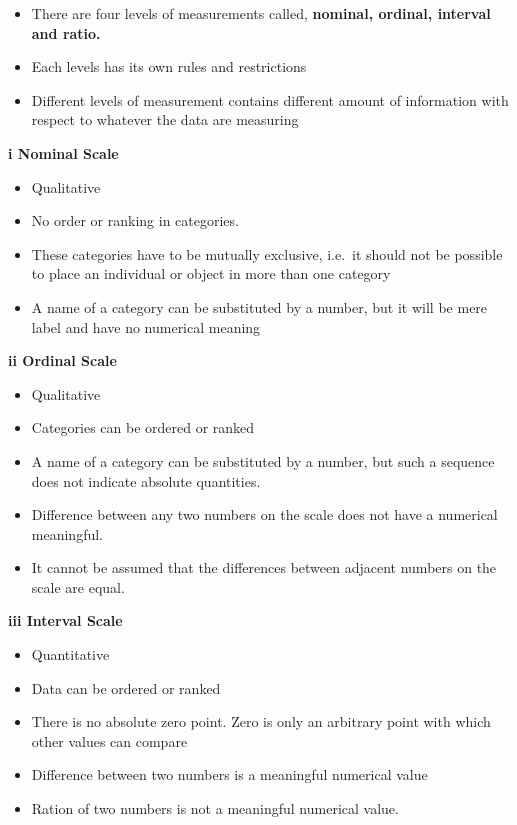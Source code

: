 \documentclass[]{book}
\providecommand{\tightlist}{%
  \setlength{\itemsep}{0pt}\setlength{\parskip}{0pt}}
\begin{document}
\begin{itemize}
\tightlist
\item
  There are four levels of measurements called, \textbf{nominal, ordinal, interval and ratio.}
\item
  Each levels has its own rules and restrictions
\item
  Different levels of measurement contains different amount of information with respect to whatever the data are measuring
\end{itemize}

\textbf{i Nominal Scale}

\begin{itemize}
\tightlist
\item
  Qualitative
\item
  No order or ranking in categories.
\item
  These categories have to be mutually exclusive, i.e.~it should not be possible to place an individual or object in more than one category
\item
  A name of a category can be substituted by a number, but it will be mere label and have no numerical meaning
\end{itemize}

\textbf{ii Ordinal Scale}

\begin{itemize}
\tightlist
\item
  Qualitative
\item
  Categories can be ordered or ranked
\item
  A name of a category can be substituted by a number, but such a sequence does not indicate absolute quantities.
\item
  Difference between any two numbers on the scale does not have a numerical meaningful.
\item
  It cannot be assumed that the differences between adjacent numbers on the scale are equal.
\end{itemize}

\textbf{iii Interval Scale}

\begin{itemize}
\tightlist
\item
  Quantitative
\item
  Data can be ordered or ranked
\item
  There is no absolute zero point. Zero is only an arbitrary point with which other values can compare
\item
  Difference between two numbers is a meaningful numerical value
\item
  Ration of two numbers is not a meaningful numerical value.
\end{itemize}
\end{document}
